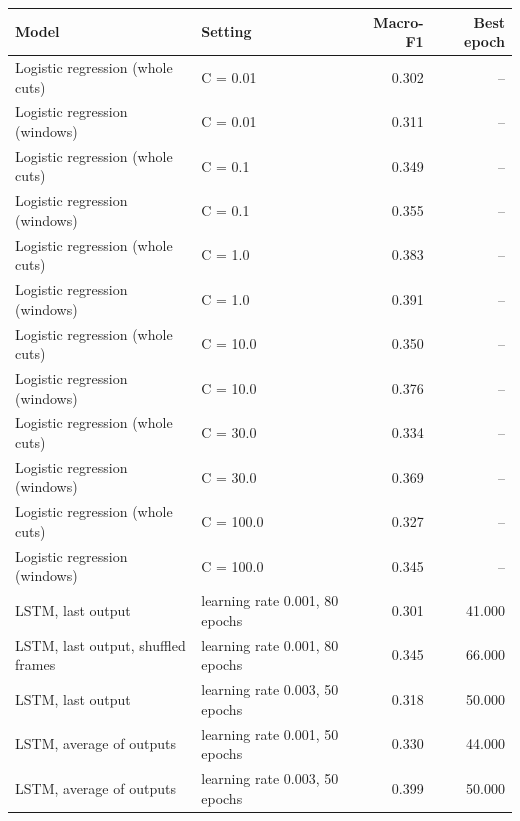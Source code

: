 \begin{tabular}{llrr}
\toprule
Model & Setting & Macro-F1 & Best epoch \\
\midrule
Logistic regression (whole cuts) & C = 0.01 & 0.302 & -- \\
Logistic regression (windows) & C = 0.01 & 0.311 & -- \\
Logistic regression (whole cuts) & C = 0.1 & 0.349 & -- \\
Logistic regression (windows) & C = 0.1 & 0.355 & -- \\
Logistic regression (whole cuts) & C = 1.0 & 0.383 & -- \\
Logistic regression (windows) & C = 1.0 & 0.391 & -- \\
Logistic regression (whole cuts) & C = 10.0 & 0.350 & -- \\
Logistic regression (windows) & C = 10.0 & 0.376 & -- \\
Logistic regression (whole cuts) & C = 30.0 & 0.334 & -- \\
Logistic regression (windows) & C = 30.0 & 0.369 & -- \\
Logistic regression (whole cuts) & C = 100.0 & 0.327 & -- \\
Logistic regression (windows) & C = 100.0 & 0.345 & -- \\
LSTM, last output & learning rate 0.001, 80 epochs & 0.301 & 41.000 \\
LSTM, last output, shuffled frames & learning rate 0.001, 80 epochs & 0.345 & 66.000 \\
LSTM, last output & learning rate 0.003, 50 epochs & 0.318 & 50.000 \\
LSTM, average of outputs & learning rate 0.001, 50 epochs & 0.330 & 44.000 \\
LSTM, average of outputs & learning rate 0.003, 50 epochs & 0.399 & 50.000 \\
\bottomrule
\end{tabular}
